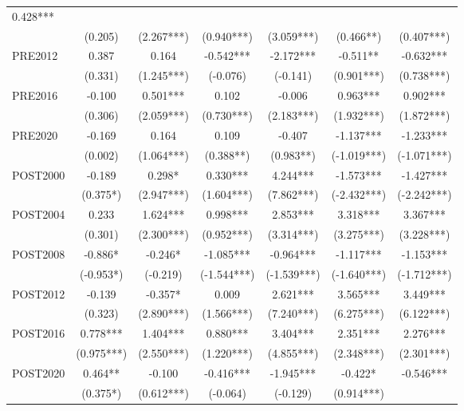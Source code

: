 \begin{table}[H]
{\begin{tabular}{l cccccc}
0.428***  \\
                & (0.205)   & (2.267***)& (0.940***)& (3.059***) & (0.466**) &
                (0.407***) \\
PRE2012         & 0.387     & 0.164     & -0.542*** & -2.172*** & -0.511** &
-0.632*** \\
                & (0.331)   & (1.245***)& (-0.076)  & (-0.141)   & (0.901***) &
                (0.738***) \\
PRE2016         & -0.100    & 0.501***  & 0.102     & -0.006    & 0.963*** &
0.902***  \\
                & (0.306)   & (2.059***)& (0.730***)& (2.183***) & (1.932***) &
                (1.872***) \\
PRE2020         & -0.169    & 0.164     & 0.109     & -0.407    & -1.137*** &
-1.233*** \\
                & (0.002)   & (1.064***)& (0.388**) & (0.983**)  & (-1.019***) &
                (-1.071***)\\
\midrule
POST2000        & -0.189    & 0.298*    & 0.330***  & 4.244***  & -1.573*** &
-1.427*** \\
                & (0.375*)  & (2.947***)& (1.604***)& (7.862***) & (-2.432***) &
                (-2.242***)\\
POST2004        & 0.233     & 1.624***  & 0.998***  & 2.853***  & 3.318*** &
3.367***  \\
                & (0.301)   & (2.300***)& (0.952***)& (3.314***) & (3.275***) &
                (3.228***) \\
POST2008        & -0.886*   & -0.246*   & -1.085*** & -0.964*** & -1.117*** &
-1.153*** \\
                & (-0.953*) & (-0.219)  & (-1.544***)& (-1.539***)& (-1.640***)
                & (-1.712***)\\
POST2012        & -0.139    & -0.357*   & 0.009     & 2.621***  & 3.565*** &
3.449***  \\
                & (0.323)   & (2.890***)& (1.566***)& (7.240***) & (6.275***) &
                (6.122***) \\
POST2016        & 0.778***  & 1.404***  & 0.880***  & 3.404***  & 2.351*** &
2.276***  \\
                & (0.975***)& (2.550***)& (1.220***)& (4.855***) & (2.348***) &
                (2.301***) \\
POST2020        & 0.464**   & -0.100    & -0.416*** & -1.945*** & -0.422* &
-0.546*** \\
                & (0.375*)  & (0.612***)& (-0.064)  & (-0.129)   & (0.914***) &

\end{tabular}}
\end{table}
